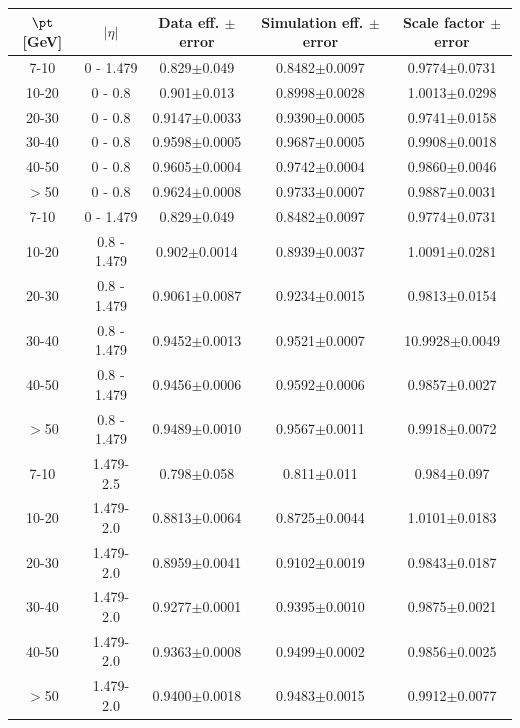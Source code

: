 \begin{table}[!h]
\vspace{0.5cm}
   \begin{tabular}{|c c c c c|}
   \hline
   $\pt$[GeV] & $|\eta|$ & Data eff. $\pm$ error & Simulation eff. $\pm$ error & Scale factor $\pm$ error \\
   \hline
   \hline
   7-10 & 0 - 1.479 & 0.829$\pm$0.049  & 0.8482$\pm$0.0097  & 0.9774$\pm$0.0731 \\
   10-20 & 0 - 0.8 & 0.901$\pm$0.013  & 0.8998$\pm$0.0028  & 1.0013$\pm$0.0298 \\
   20-30 & 0 - 0.8 & 0.9147$\pm$0.0033  & 0.9390$\pm$0.0005  & 0.9741$\pm$0.0158 \\
   30-40 & 0 - 0.8 & 0.9598$\pm$0.0005  & 0.9687$\pm$0.0005  & 0.9908$\pm$0.0018 \\
   40-50 & 0 - 0.8 & 0.9605$\pm$0.0004  & 0.9742$\pm$0.0004  & 0.9860$\pm$0.0046 \\
   $>$50 & 0 - 0.8 & 0.9624$\pm$0.0008  & 0.9733$\pm$0.0007  & 0.9887$\pm$0.0031 \\
   \hline
   7-10 & 0 - 1.479   & 0.829$\pm$0.049  & 0.8482$\pm$0.0097  & 0.9774$\pm$0.0731 \\
   10-20 & 0.8 - 1.479 & 0.902$\pm$0.0014  & 0.8939$\pm$0.0037  & 1.0091$\pm$0.0281 \\
   20-30 & 0.8 - 1.479 & 0.9061$\pm$0.0087  & 0.9234$\pm$0.0015  & 0.9813$\pm$0.0154 \\
   30-40 & 0.8 - 1.479 & 0.9452$\pm$0.0013  & 0.9521$\pm$0.0007  & 10.9928$\pm$0.0049 \\
   40-50 & 0.8 - 1.479 & 0.9456$\pm$0.0006  & 0.9592$\pm$0.0006  & 0.9857$\pm$0.0027 \\
   $>$50 & 0.8 - 1.479 & 0.9489$\pm$0.0010  & 0.9567$\pm$0.0011  & 0.9918$\pm$0.0072 \\
   \hline
   7-10 & 1.479-2.5 & 0.798$\pm$0.058  & 0.811$\pm$0.011  & 0.984$\pm$0.097 \\
   10-20 & 1.479-2.0 & 0.8813$\pm$0.0064  & 0.8725$\pm$0.0044  & 1.0101$\pm$0.0183 \\
   20-30 & 1.479-2.0 & 0.8959$\pm$0.0041  & 0.9102$\pm$0.0019  & 0.9843$\pm$0.0187 \\
   30-40 & 1.479-2.0 & 0.9277$\pm$0.0001  & 0.9395$\pm$0.0010  & 0.9875$\pm$0.0021 \\
   40-50 & 1.479-2.0 & 0.9363$\pm$0.0008  & 0.9499$\pm$0.0002  & 0.9856$\pm$0.0025 \\
   $>$50 & 1.479-2.0 & 0.9400$\pm$0.0018  & 0.9483$\pm$0.0015  & 0.9912$\pm$0.0077 \\


\end{tabular}
\end{table}
